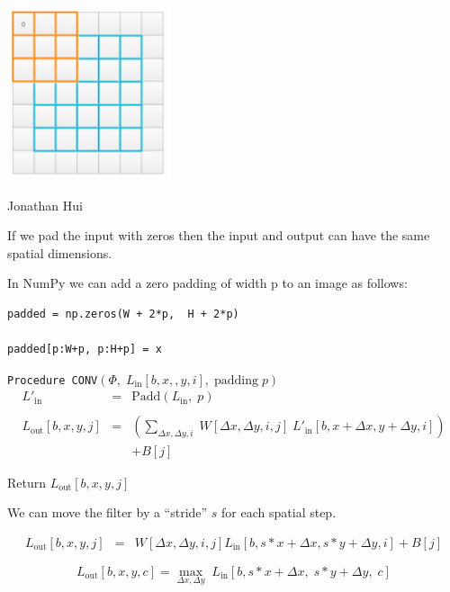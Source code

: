 {

\centerline{\includegraphics[height = 2.0in]{../images/padding2}}
\centerline{\large Jonathan Hui}

\vfill
If we pad the input with zeros then the input and output can have the same spatial dimensions.


In NumPy we can add a zero padding of width p to an image as follows:

\vfill
\begin{verbatim}
padded = np.zeros(W + 2*p,  H + 2*p)

padded[p:W+p, p:H+p] = x
\end{verbatim}


{\tt Procedure CONV}$(\Phi,\; L_{\mathrm{in}}[b,x,,y,i],\;\mathrm{padding}\;p)$
\vfill
\begin{eqnarray*}
 L'_{\mathrm{in}} & = & \mathrm{Padd}(L_{\mathrm{in}},\;p) \\
 \\
L_{\mathrm{out}}[b,x,y,j] & = &   \left(\sum_{\Delta x, \Delta y, i}\;W[\Delta x, \Delta y, i,j]\; L'_{\mathrm{in}}[b,x + \Delta x, y + \Delta y, i]\right) \\
& & + B[j]
\end{eqnarray*}

\vfill
Return $L_{\mathrm{out}}[b,x,y,j]$


We can move the filter by a ``stride'' $s$ for each spatial step.

\vfill
\begin{eqnarray*}
  L_{\mathrm{out}}[b,x,y,j] & = &  W[\Delta x, \Delta y, i, j] L_{\mathrm{in}}[b,s*x + \Delta x, s*y + \Delta y, i] + B[j]
\end{eqnarray*}


$$L_{\mathrm{out}}[b,x,y,c] = \max_{\Delta x, \Delta y}\; L_{\mathrm{in}}[b,s*x + \Delta x,\; s*y + \Delta y,\; c]$$

}
